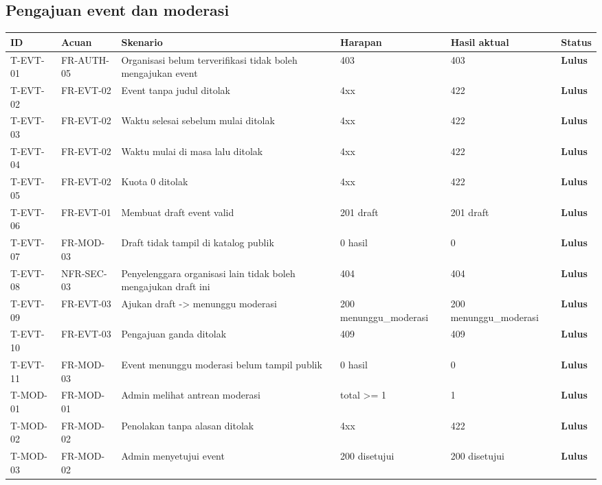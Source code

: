 \documentclass[11pt,a4paper]{article}
\renewcommand{\arraystretch}{1.2}
\begin{document}
\subsection{Pengajuan event dan moderasi}
{\footnotesize\setlength{\parskip}{0pt}\renewcommand{\arraystretch}{1.15}
\begin{longtable}{p{1.8cm}p{1.9cm}p{4.0cm}p{2.4cm}p{3.4cm}p{1.2cm}}
\toprule ID & Acuan & Skenario & Harapan & Hasil aktual & Status\\\midrule\endhead
\mbox{T-EVT-01} & FR-AUTH-05 & Organisasi belum terverifikasi tidak boleh mengajukan event & 403 & 403 & \textbf{Lulus}\\
\midrule
\mbox{T-EVT-02} & FR-EVT-02 & Event tanpa judul ditolak & 4xx & 422 & \textbf{Lulus}\\
\midrule
\mbox{T-EVT-03} & FR-EVT-02 & Waktu selesai sebelum mulai ditolak & 4xx & 422 & \textbf{Lulus}\\
\midrule
\mbox{T-EVT-04} & FR-EVT-02 & Waktu mulai di masa lalu ditolak & 4xx & 422 & \textbf{Lulus}\\
\midrule
\mbox{T-EVT-05} & FR-EVT-02 & Kuota 0 ditolak & 4xx & 422 & \textbf{Lulus}\\
\midrule
\mbox{T-EVT-06} & FR-EVT-01 & Membuat draft event valid & 201 draft & 201 draft & \textbf{Lulus}\\
\midrule
\mbox{T-EVT-07} & FR-MOD-03 & Draft tidak tampil di katalog publik & 0 hasil & 0 & \textbf{Lulus}\\
\midrule
\mbox{T-EVT-08} & NFR-SEC-03 & Penyelenggara organisasi lain tidak boleh mengajukan draft ini & 404 & 404 & \textbf{Lulus}\\
\midrule
\mbox{T-EVT-09} & FR-EVT-03 & Ajukan draft -\textgreater{} menunggu moderasi & 200 menunggu\_moderasi & 200 menunggu\_moderasi & \textbf{Lulus}\\
\midrule
\mbox{T-EVT-10} & FR-EVT-03 & Pengajuan ganda ditolak & 409 & 409 & \textbf{Lulus}\\
\midrule
\mbox{T-EVT-11} & FR-MOD-03 & Event menunggu moderasi belum tampil publik & 0 hasil & 0 & \textbf{Lulus}\\
\midrule
\mbox{T-MOD-01} & FR-MOD-01 & Admin melihat antrean moderasi & total \textgreater{}= 1 & 1 & \textbf{Lulus}\\
\midrule
\mbox{T-MOD-02} & FR-MOD-02 & Penolakan tanpa alasan ditolak & 4xx & 422 & \textbf{Lulus}\\
\midrule
\mbox{T-MOD-03} & FR-MOD-02 & Admin menyetujui event & 200 disetujui & 200 disetujui & \textbf{Lulus}\\

\end{longtable}}
\end{document}
